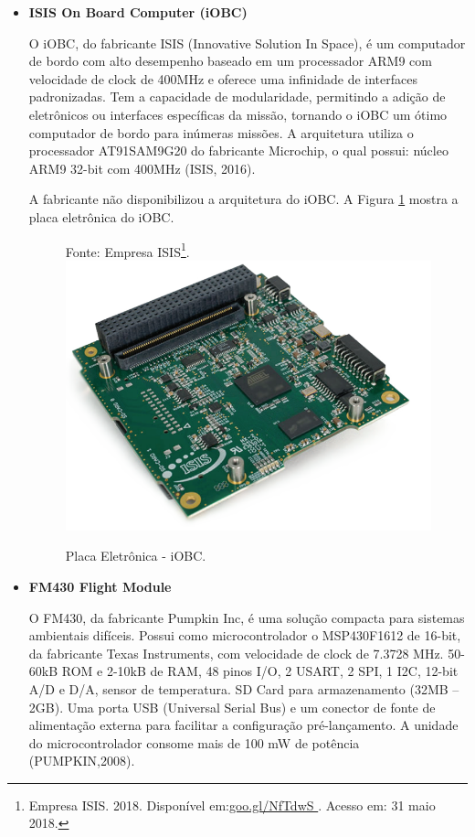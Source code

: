 \begin{itemize}
\newpage

\item \textbf{ISIS On Board Computer (iOBC)}

O iOBC, do fabricante  ISIS (Innovative Solution In Space), é um computador de bordo com alto desempenho baseado em um processador ARM9 com velocidade de clock de 400MHz e oferece uma infinidade de interfaces padronizadas. Tem a capacidade de modularidade, permitindo a adição de eletrônicos ou interfaces específicas da missão, tornando o iOBC um ótimo computador de bordo para inúmeras missões.	A arquitetura utiliza o processador AT91SAM9G20 do fabricante Microchip, o qual possui: núcleo ARM9 32-bit com 400MHz (ISIS, 2016).

A fabricante não disponibilizou a arquitetura do iOBC. A Figura \ref{fig14} mostra a placa eletrônica do iOBC. 

\begin{figure}[h]
	\centering
    Fonte: Empresa ISIS\footnote{Empresa ISIS. 2018. Disponível em:\url{goo.gl/NfTdwS
}. Acesso em: 31 maio 2018.}. \linebreak
	\includegraphics[keepaspectratio=true,scale=0.48]{figuras/isis.PNG}
	\caption{Placa Eletrônica - iOBC.}
	\label{fig14}
\end{figure}

\newpage
\item \textbf{FM430 Flight Module}

O FM430, da fabricante Pumpkin Inc, é uma solução compacta para sistemas ambientais difíceis. Possui como microcontrolador o MSP430F1612 de 16-bit, da fabricante Texas Instruments, com velocidade de clock de 7.3728 MHz. 50-60kB ROM e 2-10kB de RAM, 48 pinos I/O, 2 USART, 2 SPI, 1 I2C, 12-bit A/D e D/A, sensor de temperatura. SD Card para armazenamento (32MB – 2GB). Uma porta USB (Universal Serial Bus) e um conector de fonte de alimentação externa para facilitar a configuração pré-lançamento. A unidade do microcontrolador consome mais de 100 mW de potência (PUMPKIN,2008).


\end{itemize}
